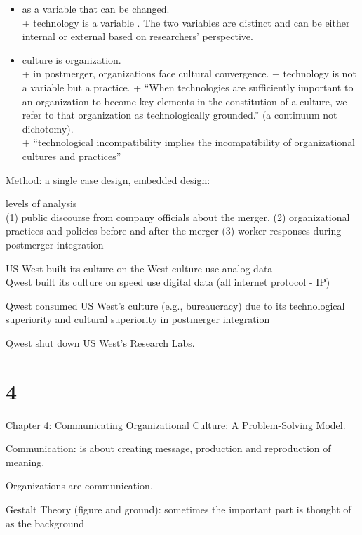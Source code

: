 \documentclass[
]{book}
\providecommand{\tightlist}{%
  \setlength{\itemsep}{0pt}\setlength{\parskip}{0pt}}
\begin{document}
\begin{itemize}
\tightlist
\item
  as a variable that can be changed.\\
  + technology is a variable . The two variables are distinct and can be either internal or external based on researchers' perspective.\\
\item
  culture is organization.\\
  + in postmerger, organizations face cultural convergence.
  + technology is not a variable but a practice.
  + ``When technologies are sufficiently important to an organization to become key elements in the constitution of a culture, we refer to that organization as technologically grounded.'' (a continuum not dichotomy).\\
  + ``technological incompatibility implies the incompatibility of organizational cultures and practices''
\end{itemize}

Method: a single case design, embedded design:

levels of analysis\\
(1) public discourse from company officials about the merger,
(2) organizational practices and policies before and after the merger
(3) worker responses during postmerger integration

US West built its culture on the West culture use analog data\\
Qwest built its culture on speed use digital data (all internet protocol - IP)

Qwest consumed US West's culture (e.g., bureaucracy) due to its technological superiority and cultural superiority in postmerger integration

Qwest shut down US West's Research Labs.

\hypertarget{section}{%
\section{4}\label{section}}

Chapter 4: Communicating Organizational Culture: A Problem-Solving Model.

Communication: is about creating message, production and reproduction of meaning.

Organizations are communication.

Gestalt Theory (figure and ground): sometimes the important part is thought of as the background
\end{document}
